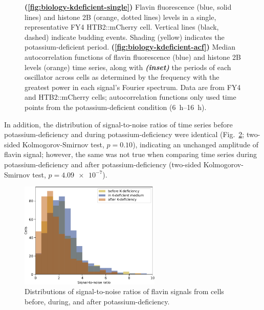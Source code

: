 \begin{figure}[p]
  \caption[
    Flavin fluorescence and histone 2B levels in a single, representative FY4 HTB2::mCherry cell.
    Median autocorrelation functions of flavin fluorescence and histone 2B levels time series, along with  the periods of each oscillator across cells.
    Data are from FY4 and HTB2::mCherry cells; autocorrelation functions only used time points from the potassium-deficient condition.
  ]{
    \textbf{(\ref{fig:biology-kdeficient-single})}
    Flavin fluorescence (blue, solid lines) and histone 2B (orange, dotted lines) levels in a single, representative FY4 HTB2::mCherry cell.
    Vertical lines (black, dashed) indicate budding events.
    Shading (yellow) indicates the potassium-deficient period.
    \textbf{(\ref{fig:biology-kdeficient-acf})}
    Median autocorrelation functions of flavin fluorescence (blue) and histone 2B levels (orange) time series, along with \textit{\textbf{(inset)}} the periods of each oscillator across cells as determined by the frequency with the greatest power in each signal's Fourier spectrum.
    Data are from FY4 and HTB2::mCherry cells; autocorrelation functions only used time points from the potassium-deficient condition (\SIrange{6}{16}{\hour}).
  }
  \label{fig:biology-kdeficient}
\end{figure}

In addition, the distribution of signal-to-noise ratios of time series before potassium-deficiency and during potassium-deficiency were identical (Fig.\ \ref{fig:biology-kdeficient-snr}; two-sided Kolmogorov-Smirnov test, $p = \num{0.10}$), indicating an unchanged amplitude of flavin signal; however, the same was not true when comparing time series during potassium-deficiency and after potassium-deficiency (two-sided Kolmogorov-Smirnov test, $p = \num{4.09e-7}$).

\begin{figure}[hb!]
  \centering
   \includegraphics[width=0.6\textwidth]{kdeficient_snr_edit.pdf}
   \caption{
     Distributions of signal-to-noise ratios of flavin signals from cells before, during, and after potassium-deficiency.
   }
  \label{fig:biology-kdeficient-snr}
\end{figure}

